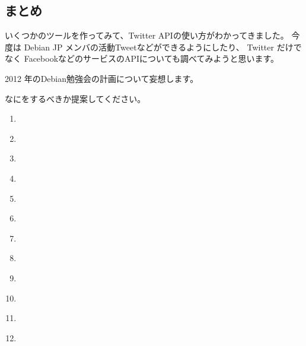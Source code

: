 \documentclass[mingoth,a4paper]{jsarticle}
\begin{document}
\subsection{まとめ}
いくつかのツールを作ってみて、Twitter APIの使い方がわかってきました。
今度は Debian JP メンバの活動Tweetなどができるようにしたり、
Twitter だけでなく
FacebookなどのサービスのAPIについても調べてみようと思います。



2012 年のDebian勉強会の計画について妄想します。

なにをするべきか提案してください。

{\LARGE
\begin{enumerate}
 \item \underline{\hspace{6cm}}
 \item \underline{\hspace{6cm}}
 \item \underline{\hspace{6cm}}
 \item \underline{\hspace{6cm}}
 \item \underline{\hspace{6cm}}
 \item \underline{\hspace{6cm}}
 \item \underline{\hspace{6cm}}
 \item \underline{\hspace{6cm}}
 \item \underline{\hspace{6cm}}
 \item \underline{\hspace{6cm}}
 \item \underline{\hspace{6cm}}
 \item \underline{\hspace{6cm}}
\end{enumerate}
}

\end{document}
